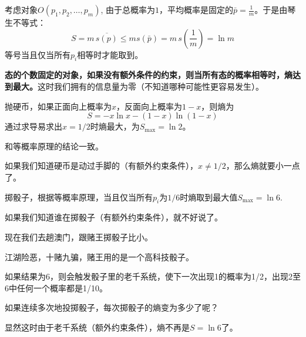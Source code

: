 \documentclass[CJK]{beamer}
\begin{document}
\begin{frame}
\bch
考虑对象$O(p_1, p_2,\ldots, p_m)$, 由于总概率为$1$，平均概率是固定的$\bar{p} =  \frac{1}{m}$。于是由琴生不等式：
$$ S = m\, \overline{s(p)} \le m s(\bar{p}) = m\, s\left(\frac{1}{m}\right) = \ln m$$
等号当且仅当所有$p_i$相等时才能取到。

\skipline

{\bf \blue 态的个数固定的对象，如果没有额外条件的约束，则当所有态的概率相等时，熵达到最大。}这时我们拥有的信息量为零（不知道哪种可能性更容易发生）。

\ech
\end{frame}

\begin{frame}
\bch

\emini
{}
抛硬币，如果正面向上概率为$x$，反面向上概率为$1-x$，则熵为
$$S = -x\ln x - (1-x)\ln (1-x)$$
通过求导易求出$x = 1/2$时熵最大，为$S_{\max} = \ln 2$。

和等概率原理的结论一致。
\emini

\skiplines

如果我们知道硬币是动过手脚的（有额外约束条件），$x\ne 1/2$，那么熵就要小一点了。
\ech
\end{frame}


\begin{frame}
\bch
{}
\emini
{}
掷骰子，根据等概率原理，当且仅当所有$p_i$为$1/6$时熵取到最大值$S_{\max} = \ln 6$.
\emini

\skiplines

\emini
{}
如果我们知道谁在掷骰子（有额外约束条件），就不好说了。
\emini
\ech
\end{frame}


\begin{frame}
\bch
现在我们去趟澳门，跟赌王掷骰子比小。

\skipline

江湖险恶，十赌九骗，赌王用的是一个高科技骰子。


\skipline

如果结果为$6$，则会触发骰子里的老千系统，使下一次出现1的概率为1/2，出现2至6中任何一个概率都是1/10。

如果连续多次地投掷骰子，每次掷骰子的熵变为多少了呢？

\skiplines

显然这时由于老千系统（额外约束条件），熵不再是$S = \ln 6$了。

\ech
\end{frame}
\end{document}
